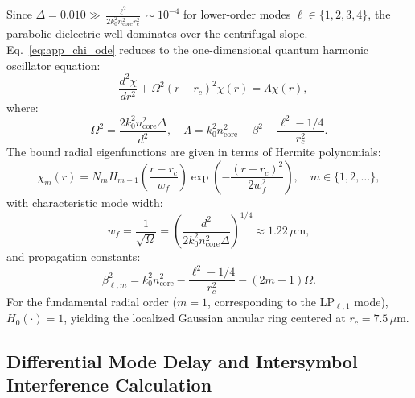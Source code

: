 \documentclass{optica-article}
\begin{document}
Since $\Delta = 0.010 \gg \frac{\ell^2}{2 k_0^2 n_{\text{core}}^2 r_c^2} \sim 10^{-4}$ for lower-order modes $\ell \in \{1, 2, 3, 4\}$, the parabolic dielectric well dominates over the centrifugal slope. Eq.~\eqref{eq:app_chi_ode} reduces to the one-dimensional quantum harmonic oscillator equation:
\begin{equation}
- \frac{d^2 \chi}{dr^2} + \Omega^2 (r - r_c)^2 \chi(r) = \Lambda \chi(r),
\label{eq:app_harmonic_oscillator}
\end{equation}
where:
\begin{equation}
\Omega^2 = \frac{2 k_0^2 n_{\text{core}}^2 \Delta}{d^2}, \quad \Lambda = k_0^2 n_{\text{core}}^2 - \beta^2 - \frac{\ell^2 - 1/4}{r_c^2}.
\label{eq:app_omega_lambda}
\end{equation}
The bound radial eigenfunctions are given in terms of Hermite polynomials:
\begin{equation}
\chi_m(r) = N_m H_{m-1}\left( \frac{r - r_c}{w_f} \right) \exp\left( - \frac{(r - r_c)^2}{2 w_f^2} \right), \quad m \in \{1, 2, \dots\},
\label{eq:app_hermite_modes}
\end{equation}
with characteristic mode width:
\begin{equation}
w_f = \frac{1}{\sqrt{\Omega}} = \left( \frac{d^2}{2 k_0^2 n_{\text{core}}^2 \Delta} \right)^{1/4} \approx 1.22\,\mu\text{m},
\label{eq:app_wf_exact}
\end{equation}
and propagation constants:
\begin{equation}
\beta_{\ell, m}^2 = k_0^2 n_{\text{core}}^2 - \frac{\ell^2 - 1/4}{r_c^2} - (2m - 1) \Omega.
\label{eq:app_beta_eigenvalues}
\end{equation}
For the fundamental radial order ($m=1$, corresponding to the LP$_{\ell, 1}$ mode), $H_0(\cdot) = 1$, yielding the localized Gaussian annular ring centered at $r_c = 7.5\,\mu\text{m}$.

\subsection{Differential Mode Delay and Intersymbol Interference Calculation}
\end{document}
